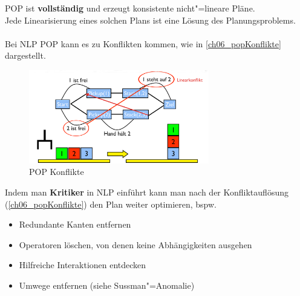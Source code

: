 \newpage
POP ist \textbf{vollständig} und erzeugt konsistente nicht"=lineare Pläne.\\
Jede Linearisierung eines solchen Plans ist eine Lösung des Planungsproblems.\\ \\
Bei NLP POP kann es zu Konflikten kommen, wie in \autoref{ch06_popKonflikte} dargestellt.
\begin{figure}[ht]\centering 
\includegraphics[width=0.7\textwidth]{figures/ch06_popKonflikte.png}
\caption{POP Konflikte}
\label{ch06_popKonflikte}
\end{figure}
Indem man \textbf{Kritiker} in NLP einführt kann man nach der Konfliktauflösung (\autoref{ch06_popKonflikte}) den Plan weiter optimieren, bspw.\
\begin{itemize}
	\item Redundante Kanten entfernen
	\item Operatoren löschen, von denen keine Abhängigkeiten ausgehen
	\item Hilfreiche Interaktionen entdecken
	\item Umwege entfernen (siehe Sussman"=Anomalie)
\end{itemize}
\newpage
